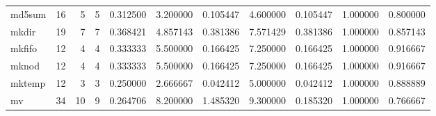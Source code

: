 \begin{longtable}{lrrrrrrrrrr}
md5sum    &                                      16 &                  5 &                                 5 &                                   0.312500 &                               3.200000 &                                     0.105447 &                          4.600000 &                                0.105447 &                           1.000000 &                                           0.800000 \\
mkdir     &                                      19 &                  7 &                                 7 &                                   0.368421 &                               4.857143 &                                     0.381386 &                          7.571429 &                                0.381386 &                           1.000000 &                                           0.857143 \\
mkfifo    &                                      12 &                  4 &                                 4 &                                   0.333333 &                               5.500000 &                                     0.166425 &                          7.250000 &                                0.166425 &                           1.000000 &                                           0.916667 \\
mknod     &                                      12 &                  4 &                                 4 &                                   0.333333 &                               5.500000 &                                     0.166425 &                          7.250000 &                                0.166425 &                           1.000000 &                                           0.916667 \\
mktemp    &                                      12 &                  3 &                                 3 &                                   0.250000 &                               2.666667 &                                     0.042412 &                          5.000000 &                                0.042412 &                           1.000000 &                                           0.888889 \\
mv        &                                      34 &                 10 &                                 9 &                                   0.264706 &                               8.200000 &                                     1.485320 &                          9.300000 &                                0.185320 &                           1.000000 &                                           0.766667 \\

\end{longtable}
